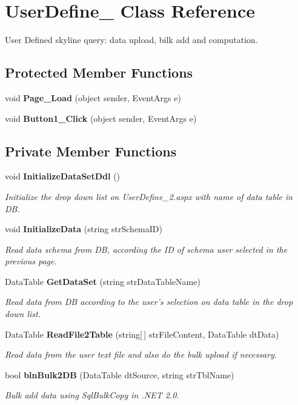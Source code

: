 \section{User\-Define\_ Class Reference}
\label{class_user_define__2}
User Defined skyline query: data upload, bilk add and computation.  


\subsection*{Protected Member Functions}
\begin{CompactItemize}
\item 
void {\bf Page\_\-Load} (object sender, Event\-Args e)
\item 
void {\bf Button1\_\-Click} (object sender, Event\-Args e)
\end{CompactItemize}
\subsection*{Private Member Functions}
\begin{CompactItemize}
\item 
void {\bf Initialize\-Data\-Set\-Ddl} ()
\begin{CompactList}\small\item\em Initialize the drop down list on User\-Define\_\-2.aspx with name of data table in DB. \item\end{CompactList}\item 
void {\bf Initialize\-Data} (string str\-Schema\-ID)
\begin{CompactList}\small\item\em Read data schema from DB, according the ID of schema user selected in the previous page. \item\end{CompactList}\item 
Data\-Table {\bf Get\-Data\-Set} (string str\-Data\-Table\-Name)
\begin{CompactList}\small\item\em Read data from DB according to the user's selection on data table in the drop down list. \item\end{CompactList}\item 
Data\-Table {\bf Read\-File2Table} (string[$\,$] str\-File\-Content, Data\-Table dt\-Data)
\begin{CompactList}\small\item\em Read data from the user text file and also do the bulk upload if necessary. \item\end{CompactList}\item 
bool {\bf bln\-Bulk2DB} (Data\-Table dt\-Source, string str\-Tbl\-Name)
\begin{CompactList}\small\item\em Bulk add data using Sql\-Bulk\-Copy in .NET 2.0. \item\end{CompactList}\end{CompactItemize}



